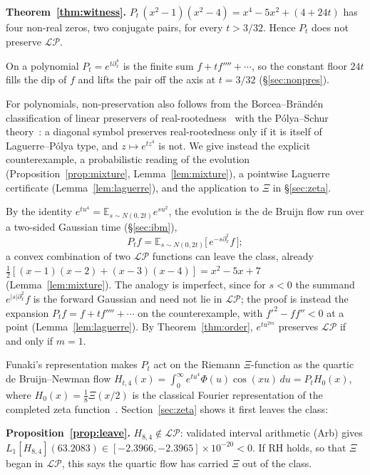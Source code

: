 \documentclass[11pt,reqno]{amsart}
\theoremstyle{plain}
\theoremstyle{definition}
\theoremstyle{remark}
\newenvironment{keyresult}{\par\medskip\noindent}{\par\medskip}
\newcommand{\E}{\mathbb E}
\newcommand{\LP}{\mathcal{LP}}
\begin{document}
\begin{keyresult}
\textbf{Theorem~\ref{thm:witness}.} $P_t\,(x^2-1)(x^2-4)=x^4-5x^2+(4+24t)$ has
four non-real zeros, two conjugate pairs, for every $t>3/32$. Hence $P_t$ does
not preserve $\LP$.
\end{keyresult}

On a polynomial $P_t=e^{t\partial_x^4}$ is the finite sum $f+tf''''+\cdots$, so
the constant floor $24t$ fills the dip of $f$ and lifts the pair off the axis at
$t=3/32$ (\S\ref{sec:nonpres}).

For polynomials, non-preservation also follows from the Borcea--Br\"and\'en
classification of linear preservers of real-rootedness~\cite{BorceaBranden} with
the P\'olya--Schur theory~\cite{PolyaSchur}: a diagonal symbol preserves
real-rootedness only if it is itself of Laguerre--P\'olya type, and
$z\mapsto e^{tz^4}$ is not. We give instead the explicit counterexample, a probabilistic
reading of the evolution (Proposition~\ref{prop:mixture}, Lemma~\ref{lem:mixture}),
a pointwise Laguerre certificate (Lemma~\ref{lem:laguerre}), and the application
to $\Xi$ in \S\ref{sec:zeta}.

By the identity $e^{tu^4}=\E_{s\sim N(0,2t)}e^{su^2}$, the evolution is the de
Bruijn flow run over a two-sided Gaussian time (\S\ref{sec:ibm}),
\begin{equation}\label{eq:mix0}
   P_tf=\E_{s\sim N(0,2t)}\bigl[\,e^{-s\partial_x^2}f\,\bigr];
\end{equation}
a convex combination of two $\LP$ functions can leave the class, already
$\tfrac12[(x-1)(x-2)+(x-3)(x-4)]=x^2-5x+7$ (Lemma~\ref{lem:mixture}). The analogy
is imperfect, since for $s<0$ the summand $e^{|s|\partial_x^2}f$ is the forward
Gaussian and need not lie in $\LP$; the proof is instead the expansion
$P_tf=f+tf''''+\cdots$ on the counterexample, with $f'^2-ff''<0$ at a point
(Lemma~\ref{lem:laguerre}). By Theorem~\ref{thm:order}, $e^{tu^{2m}}$ preserves
$\LP$ if and only if $m=1$.

Funaki's representation makes $P_t$ act on the Riemann $\Xi$-function as the
quartic de Bruijn--Newman flow
$H_{t,4}(x)=\int_0^\infty e^{tu^4}\Phi(u)\cos(xu)\,du=P_tH_0(x)$, where
$H_0(x)=\tfrac18\Xi(x/2)$ is the classical Fourier representation of the
completed zeta function~\cite{Titchmarsh,Polya27}. Section~\ref{sec:zeta} shows it first leaves the class:

\begin{keyresult}
\textbf{Proposition~\ref{prop:leave}.} $H_{8,4}\notin\LP$: validated interval
arithmetic (Arb) gives $L_1[H_{8,4}](63.2083)\in[-2.3966,-2.3965]\times10^{-20}<0$.
If RH holds, so that $\Xi$ began in $\LP$, this says the quartic flow has carried
$\Xi$ out of the class.
\end{keyresult}
\end{document}
